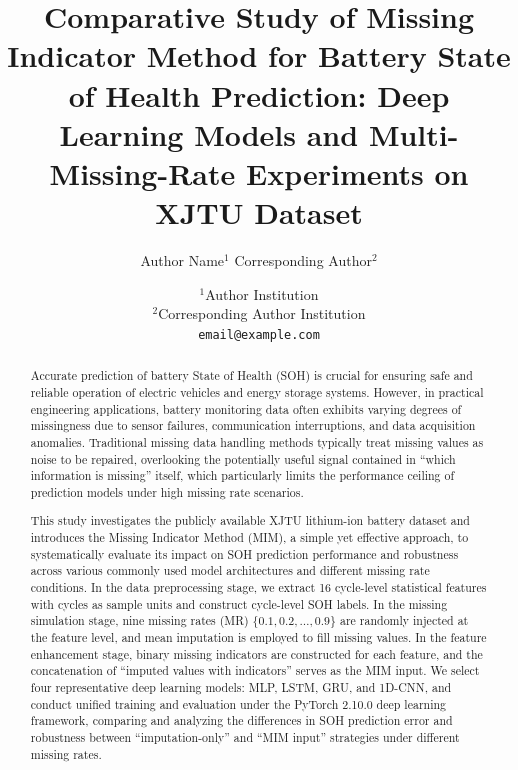 \documentclass[10pt,a4paper]{article}
\title{\textbf{Comparative Study of Missing Indicator Method for Battery State of Health Prediction: Deep Learning Models and Multi-Missing-Rate Experiments on XJTU Dataset}}
\author{Author Name$^{1}$ \quad Corresponding Author$^{2}$}
\date{$^{1}$Author Institution \\ $^{2}$Corresponding Author Institution \\ \texttt{email@example.com}}
\begin{document}
\maketitle

\begin{abstract}
Accurate prediction of battery State of Health (SOH) is crucial for ensuring safe and reliable operation of electric vehicles and energy storage systems. However, in practical engineering applications, battery monitoring data often exhibits varying degrees of missingness due to sensor failures, communication interruptions, and data acquisition anomalies. Traditional missing data handling methods typically treat missing values as noise to be repaired, overlooking the potentially useful signal contained in ``which information is missing'' itself, which particularly limits the performance ceiling of prediction models under high missing rate scenarios.

This study investigates the publicly available XJTU lithium-ion battery dataset and introduces the Missing Indicator Method (MIM), a simple yet effective approach, to systematically evaluate its impact on SOH prediction performance and robustness across various commonly used model architectures and different missing rate conditions. In the data preprocessing stage, we extract 16 cycle-level statistical features with cycles as sample units and construct cycle-level SOH labels. In the missing simulation stage, nine missing rates (MR) $\{0.1, 0.2, \ldots, 0.9\}$ are randomly injected at the feature level, and mean imputation is employed to fill missing values. In the feature enhancement stage, binary missing indicators are constructed for each feature, and the concatenation of ``imputed values with indicators'' serves as the MIM input. We select four representative deep learning models: MLP, LSTM, GRU, and 1D-CNN, and conduct unified training and evaluation under the PyTorch 2.10.0 deep learning framework, comparing and analyzing the differences in SOH prediction error and robustness between ``imputation-only'' and ``MIM input'' strategies under different missing rates.


\end{abstract}
\end{document}
